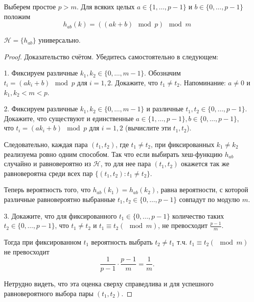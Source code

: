 Выберем простое $p > m$. Для всяких целых $a \in \{1, \ldots, p-1\}$ и $b \in \{0, \ldots, p-1\}$ положим $$h_{ab}(k) = ((ak+b)\mod p) \mod m$$
\begin{theorem*}
	$\mathcal{H} = \{h_{ab}\}$  универсально.
\end{theorem*}
\begin{proof}
Доказательство счётом. Убедитесь самостоятельно в следующем:

1. Фиксируем различные $k_1, k_2 \in \{0, \ldots, m-1\}$. Обозначим $t_i = (ak_i + b)\mod p$ для $i = 1,2$. Докажите, что $t_1 \neq t_2$. Напоминание: $a\neq 0$ и $k_1, k_2 < m < p$.

2. Фиксируем различные $k_1, k_2 \in \{0, \ldots, m-1\}$ и различные $t_1, t_2 \in \{0, \ldots, p-1\}$. Докажите, что существуют и единственные $a \in \{1, \ldots, p-1\}, b \in \{0, \ldots, p-1\}$, что $t_i = (ak_i+b)\mod p$ для $i=1,2$ (вычислите эти $t_1, t_2$).

Следовательно, каждая пара $(t_1, t_2)$, где $t_1 \neq t_2$, при фиксированных $k_1 \neq k_2$ реализуема ровно одним способом. Так что если выбирать хеш-функцию $h_{ab}$ случайно и равновероятно из $\mathcal{H}$, то для нее пара $(t_1, t_2)$ окажется так же равновероятна среди всех пар $\{(t_1, t_2) \colon t_1 \neq t_2\}$. 

Теперь вероятность того, что $h_{ab}(k_1) = h_{ab}(k_2)$, равна вероятности, с которой различные равновероятно выбранные $t_1, t_2 \in \{0, \ldots, p-1\}$ совпадут по модулю $m$. 

3. Докажите, что для фиксированного $t_1 \in \{0, \ldots, p-1\}$ количество таких $t_2 \in \{0, \ldots, p-1\}$, что $t_1 \neq t_2$ и $t_1 \equiv t_2 (\mod m)$, не превосходит $\frac{p-1}{m}$.

Тогда при фиксированном $t_1$ вероятность выбрать $t_2 \neq t_1$ т.ч. $t_1\equiv t_2 (\mod m)$ не превосходит $$\frac{1}{p-1} \cdot \frac{p-1}{m} = \frac{1}{m}.$$

Нетрудно видеть, что эта оценка сверху справедлива и для успешного равновероятного выбора пары $(t_1, t_2)$. 
\end{proof}



